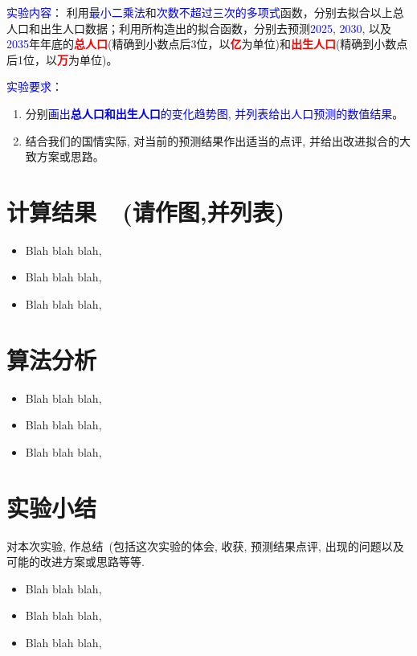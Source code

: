 \documentclass[UTF8]{ctexart}
\begin{document}
\textcolor{blue}{实验内容}：
利用\textcolor{blue}{最小二乘法}和\textcolor{blue}{次数不超过三次的多项式}函数，分别去拟合以上{\color{blue}总人口和出生人口数据}；利用所构造出的拟合函数，分别去预测\textcolor{blue}{2025}, \textcolor{blue}{2030}, 以及\textcolor{blue}{2035}年年底的\textcolor{red}{\textbf{总人口}}(精确到小数点后3位，以\textcolor{red}{\textbf{亿}}为单位)和\textcolor{red}{\textbf{出生人口}}(精确到小数点后1位，以\textcolor{red}{\textbf{万}}为单位)。

\vspace{0.5cm}\textcolor{blue}{实验要求}：

\begin{enumerate}
    \item 分别\textcolor{blue}{画出\textbf{总人口和出生人口}的变化趋势图, 并列表给出人口预测的数值结果}。
    \item 结合我们的国情实际, 对当前的预测结果作出适当的点评, 并给出改进拟合的大致方案或思路。
\end{enumerate}

\newpage
\section{计算结果~~(请作图,并列表)}


\begin{itemize}
    \item Blah blah blah,

    \item Blah blah blah,

    \item Blah blah blah,
\end{itemize}

\section{算法分析}

    \begin{itemize}
        \item Blah blah blah,

        \item Blah blah blah,

        \item Blah blah blah,
    \end{itemize}

\section{实验小结}
{\color{blue}对本次实验, 作总结~(包括这次实验的体会, 收获, 预测结果点评, 出现的问题以及可能的改进方案或思路等等}.
\begin{itemize}
    \item Blah blah blah,
    \item Blah blah blah,
    \item Blah blah blah,

\end{itemize}
\end{document}
